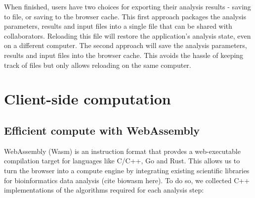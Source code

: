 \documentclass{article}
\begin{document}
When finished, users have two choices for exporting their analysis results - saving to file, or saving to the browser cache.
This first approach packages the analysis parameters, results and input files into a single file that can be shared with collaborators.
Reloading this file will restore the application's analysis state, even on a different computer.
The second approach will save the analysis parameters, results and input files into the browser cache.
This avoids the hassle of keeping track of files but only allows reloading on the same computer.

\section{Client-side computation}

\subsection{Efficient compute with WebAssembly}

WebAssembly (Wasm) is an instruction format that provdes a web-executable compilation target for languages like C/C++, Go and Rust.
This allows us to turn the browser into a compute engine by integrating existing scientific libraries for bioinformatics data analysis (cite biowasm here).
To do so, we collected C++ implementations of the algorithms required for each analysis step:
\end{document}
